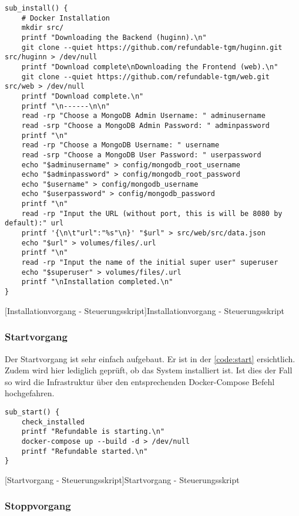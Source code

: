 \begin{verbatim}
sub_install() {
	# Docker Installation
	mkdir src/
	printf "Downloading the Backend (huginn).\n"
	git clone --quiet https://github.com/refundable-tgm/huginn.git src/huginn > /dev/null
	printf "Download complete\nDownloading the Frontend (web).\n"
	git clone --quiet https://github.com/refundable-tgm/web.git src/web > /dev/null
	printf "Download complete.\n"
	printf "\n------\n\n"
	read -rp "Choose a MongoDB Admin Username: " adminusername
	read -srp "Choose a MongoDB Admin Password: " adminpassword
	printf "\n"
	read -rp "Choose a MongoDB Username: " username
	read -srp "Choose a MongoDB User Password: " userpassword
	echo "$adminusername" > config/mongodb_root_username
	echo "$adminpassword" > config/mongodb_root_password
	echo "$username" > config/mongodb_username
	echo "$userpassword" > config/mongodb_password
	printf "\n"
	read -rp "Input the URL (without port, this is will be 8080 by default):" url
	printf '{\n\t"url":"%s"\n}' "$url" > src/web/src/data.json
	echo "$url" > volumes/files/.url
	printf "\n"
	read -rp "Input the name of the initial super user" superuser
	echo "$superuser" > volumes/files/.url
	printf "\nInstallation completed.\n"
}
\end{verbatim}
[Installationvorgang - Steuerungsskript]{Installationvorgang - Steuerungsskript}
\label{code:installer}

\subsubsection{Startvorgang}

Der Startvorgang ist sehr einfach aufgebaut. Er ist in der \autoref{code:start} ersichtlich. Zudem wird hier lediglich geprüft, ob das System installiert ist. Ist dies der Fall so wird die Infrastruktur über den entsprechenden Docker-Compose Befehl hochgefahren. 

\newpage

\begin{verbatim}
sub_start() {
	check_installed
	printf "Refundable is starting.\n"
	docker-compose up --build -d > /dev/null
	printf "Refundable started.\n"
}
\end{verbatim}
[Startvorgang - Steuerungsskript]{Startvorgang - Steuerungsskript}
\label{code:start}

\subsubsection{Stoppvorgang}

